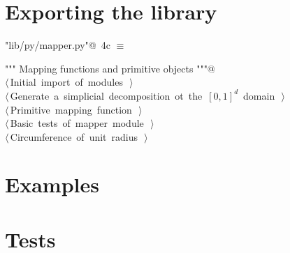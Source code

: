 \documentclass[11pt,oneside]{article}	%
\begin{document}
\section{Exporting the library}
\begin{flushleft} \small \label{scrap12}
\protect{}\verb@"lib/py/mapper.py"@\nobreak\ {\footnotesize 4c }$\equiv$
\vspace{-1ex}
\begin{list}{}{} \item
\mbox{}\verb@""" Mapping functions and primitive objects """@\\
\mbox{}\verb@@\hbox{$\langle\,$Initial import of modules\nobreak\ {\footnotesize {}}$\,\rangle$}\verb@@\\
\mbox{}\verb@@\hbox{$\langle\,$Generate a simplicial decomposition ot the $[0,1]^d$ domain\nobreak\ {\footnotesize {}}$\,\rangle$}\verb@@\\
\mbox{}\verb@@\hbox{$\langle\,$Primitive mapping function\nobreak\ {\footnotesize {}}$\,\rangle$}\verb@@\\
\mbox{}\verb@@\hbox{$\langle\,$Basic tests of mapper module\nobreak\ {\footnotesize {}}$\,\rangle$}\verb@@\\
\mbox{}\verb@@\hbox{$\langle\,$Circumference of unit radius\nobreak\ {\footnotesize {}}$\,\rangle$}\verb@@\\
\mbox{}\verb@@{\NWsep}
\end{list}
\vspace{-2ex}
\end{flushleft}
\section{Examples}
\section{Tests}
\end{document}
